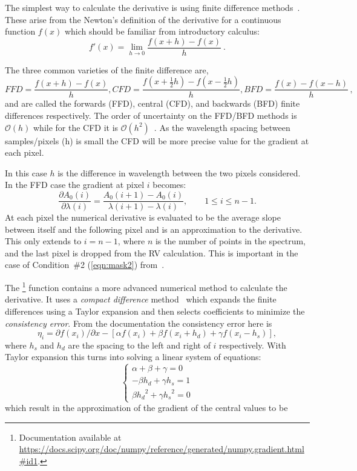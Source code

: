 The simplest way to calculate the derivative is using finite difference methods~\citep{quarteroni_numerical_2000}.
These arise from the Newton's definition of the derivative for a continuous function \(f(x)\) which should be familiar from introductory calculus:
\[f'(x) = \lim_{h \to 0} \frac{f(x+h)-f(x)}{h}~.\]

The three common varieties of the finite difference are,
\begin{equation}
{FFD} = \frac{f(x+h)-f(x)}{h}, {CFD}=\frac{f(x+\frac{1}{2}h)-f(x-\frac{1}{2}h)}{h}, {BFD}=\frac{f(x)-f(x-h)}{h}\,,
\end{equation}
and are called the forwards ({FFD}), central ({CFD}), and backwards ({BFD}) finite differences respectively.
The order of uncertainty on the {FFD}/{BFD} methods is \(\mathcal{O}(h)\) while for the {CFD} it is \(\mathcal{O}({h}^{2})\)~\citep{quarteroni_numerical_2000}.
As the wavelength spacing between samples/pixels (h) is small the {CFD} will be more precise value for the gradient at each pixel.

In this case \(h\) is the difference in wavelength between the two pixels considered.
In the {FFD} case the gradient at pixel \(i\) becomes:
\begin{equation}
\frac{\partial {A}_{0}(i)}{\partial\lambda(i)} = \frac{{A}_{0}(i+1) - {A}_{0}(i)}{\lambda(i+1)-\lambda(i)}, \hspace{2em} 1 \leq i \leq n-1.
\label{eqn:ffd_precision}
\end{equation}
At each pixel the numerical derivative is evaluated to be the average slope between itself and the following pixel and is an approximation to the derivative.
This only extends to \(i= n-1\), where \(n\) is the number of points in the spectrum, and the last pixel is dropped from the {RV} calculation.
This is important in the case of Condition~\#2 (\cref{eqn:mask2}) from~\citet{figueira_radial_2016}.


The \npgradient{}\footnote{Documentation available at \href{https://docs.scipy.org/doc/numpy/reference/generated/numpy.gradient.html\#id1 }{https://docs.scipy.org/doc/numpy/reference/generated/numpy.gradient.html\#id1}.} function contains a more advanced numerical method to calculate the derivative.
It uses a \textit{compact difference} method~\citep{quarteroni_numerical_2000} which expands the finite differences using a Taylor expansion and then selects coefficients to minimize the \textit{consistency error}.
From the \numpy{} documentation the consistency error here is \[\eta_i = \partial{f(x_i)}/\partial{x} -  [\alpha f(x_i) + \beta f(x_i +h_d) + \gamma f(x_i - h_s)],\] where \(h_s\) and \(h_d\) are the spacing to the left and right of \(i\) respectively.
With Taylor expansion this turns into solving a linear system of equations:
\[\begin{cases}
\alpha + \beta + \gamma = 0\\
-\beta {h_d} + \gamma {h_s} = 1\\
\beta {h_{d}}^{2} + \gamma {h_{s}}^{2} = 0
\end{cases}
\]
which result in the approximation of the gradient of the central values to be

